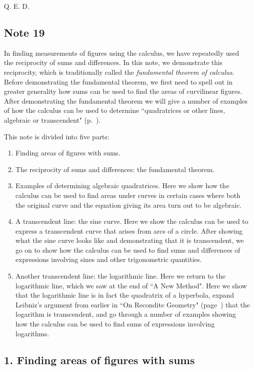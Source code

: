 \documentclass[polutonikogreek,english,twoside,openright]{article}
\begin{document}
\noindent Q. E. D.

\subsection*{Note 19}
\label{crg19}

In finding measurements of figures using the calculus, we have
repeatedly used the reciprocity of sums and differences.  In this
note, we demonstrate this reciprocity, which is traditionally called
the {\em fundamental theorem of calculus}.  Before demonstrating the
fundamental theorem, we first need to spell out in greater generality
how sums can be used to find the areas of curvilinear figures.  After
demonstrating the fundamental theorem we will give a number of
examples of how the calculus can be used to determine ``quadratrices
or other lines, algebraic or transcendent" (p.~\pageref{quadothalg}).

This note is divided into five parts:
\begin{enumerate}
\item Finding areas of figures with sums.
\item The reciprocity of sums and differences: the fundamental
  theorem.
\item Examples of determining algebraic quadratrices.  Here we show
  how the calculus can be used to find areas under curves in certain
  cases where both the original curve and the equation giving its area
  turn out to be algebraic.
\item A transcendent line: the sine curve.  Here we show the calculus
  can be used to express a transcendent curve that arises from arcs of
  a circle.  After showing what the sine curve looks like and
  demonstrating that it is transcendent, we go on to show how the
  calculus can be used to find sums and differences of expressions
  involving sines and other trigonometric quantities.
\item Another transcendent line: the logarithmic line.  Here we return
  to the logarithmic line, which we saw at the end of ``A New Method".
  Here we show that the logarithmic line is in fact the quadratrix of
  a hyperbola, expand Leibniz's argument from earlier in ``On
  Recondite Geometry" (page~\pageref{logtrans}) that the logarithm is
  transcendent, and go through a number of examples showing how the
  calculus can be used to find sums of expressions involving
  logarithms.
\end{enumerate}

\subsection*{1. Finding areas of figures with sums}
\end{document}
